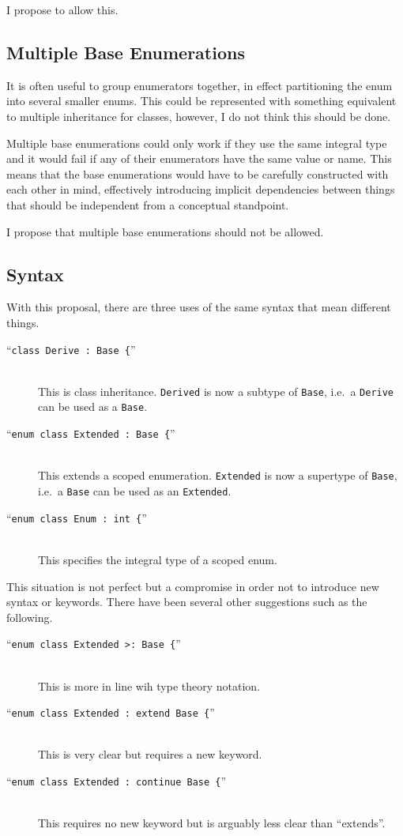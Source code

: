 \documentclass{scrartcl}
\begin{document}
I propose to allow this.

\subsection{Multiple Base Enumerations}
It is often useful to group enumerators together, in effect partitioning the
enum into several smaller enums.
This could be represented with something equivalent to multiple inheritance for
classes, however, I do not think this should be done.

Multiple base enumerations could only work if they use the same integral type
and it would fail if any of their enumerators have the same value or name.
This means that the base enumerations would have to be carefully constructed
with each other in mind, effectively introducing implicit dependencies between
things that should be independent from a conceptual standpoint.

I propose that multiple base enumerations should not be allowed.

\subsection{Syntax}
With this proposal, there are three uses of the same syntax that mean different things.
\begin{description}
\item[``\texttt{class\ Derive\ :\ Base\ \{}'']\hfill\\This is class inheritance. \texttt{Derived} is now a subtype of \texttt{Base}, i.e.\ a \texttt{Derive} can be used as a \texttt{Base}.
\item[``\texttt{enum class\ Extended\ :\ Base\ \{}'']\hfill\\ This extends a scoped enumeration. \texttt{Extended} is now a supertype of \texttt{Base}, i.e.\ a \texttt{Base} can be used as an \texttt{Extended}.
\item[``\texttt{enum class\ Enum\ :\ int\ \{}'']\hfill\\ This specifies the integral type of a scoped enum.
\end{description}

\noindent
This situation is not perfect but a compromise in order not to introduce new syntax or keywords.
There have been several other suggestions such as the following.

\begin{description}
\item[``\texttt{enum class\ Extended\ >:\ Base\ \{}'']\hfill\\This is more in line wih type theory notation.
\item[``\texttt{enum class\ Extended\ :\ extend\ Base\ \{}'']\hfill\\This is very clear but requires a new keyword.
\item[``\texttt{enum class\ Extended\ :\ continue\ Base\ \{}'']\hfill\\This requires no new keyword but is arguably less clear than ``extends''.
\end{description}
\end{document}
